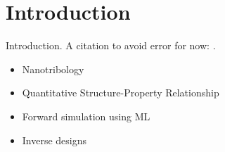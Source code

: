 \chapter*{Introduction}
Introduction. A citation to avoid error for now: \cite{li_evolving_2016}.

\begin{itemize}
    \item Nanotribology
    \item Quantitative Structure-Property Relationship
    \item Forward simulation using ML
    \item Inverse designs
\end{itemize}


